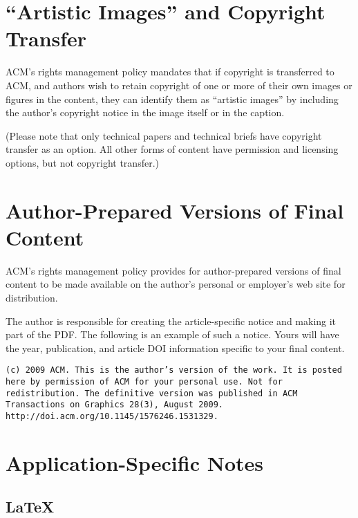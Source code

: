 \documentclass[tog]{acmsiggraph}
\begin{document}
\section{``Artistic Images'' and Copyright Transfer}

ACM's rights management policy mandates that if copyright is
transferred to ACM, and authors wish to retain copyright of one or
more of their own images or figures in the content, they can identify
them as ``artistic images'' by including the author's copyright notice
in the image itself or in the caption.

(Please note that only technical papers and technical briefs have
copyright transfer as an option. All other forms of content have
permission and licensing options, but not copyright transfer.)

\section{Author-Prepared Versions of Final Content}

ACM's rights management policy provides for author-prepared versions
of final content to be made available on the author's personal or
employer's web site for distribution.

The author is responsible for creating the article-specific notice and
making it part of the PDF. The following is an example of such a
notice. Yours will have the year, publication, and article DOI
information specific to your final content.

\texttt{\small(c) 2009 ACM. This is the author's version of the work. It is posted here by permission of ACM for your personal use. Not for redistribution. The definitive version was published in ACM Transactions on Graphics 28(3), August 2009. http://doi.acm.org/10.1145/1576246.1531329.}

\section{Application-Specific Notes}

\subsection{\LaTeX}
\end{document}
